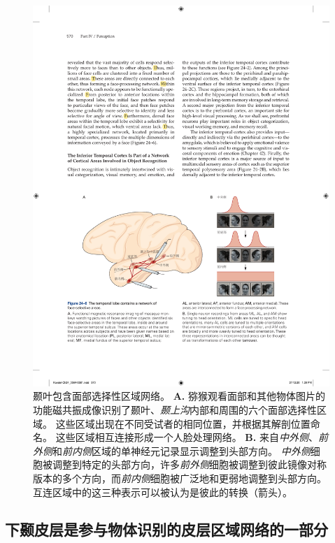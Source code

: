 \begin{figure}[htbp]
	\centering
	\includegraphics[width=1.0\linewidth]{chap24/fig_24_6}
	\caption{颞叶包含面部选择性区域网络。
		\textbf{A.} 猕猴观看面部和其他物体图片的功能磁共振成像识别了颞叶、\textit{颞上沟}内部和周围的六个面部选择性区域。
		这些区域出现在不同受试者的相同位置，并根据其解剖位置命名。
		这些区域相互连接形成一个人脸处理网络。
		\textbf{B.} 来自\textit{中外侧}、\textit{前外侧}和\textit{前内侧}区域的单神经元记录显示调整到头部方向。
		\textit{中外侧}细胞被调整到特定的头部方向，许多\textit{前外侧}细胞被调整到彼此镜像对称版本的多个方向，而\textit{前内侧}细胞被广泛地和更弱地调整到头部方向。
		互连区域中的这三种表示可以被认为是彼此的转换（箭头）。}
	\label{fig:24_6}
\end{figure}



\subsection{下颞皮层是参与物体识别的皮层区域网络的一部分}

